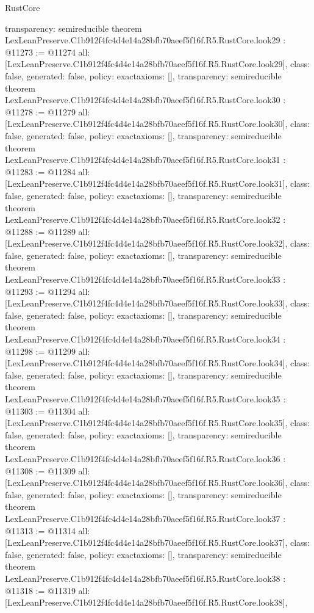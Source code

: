 \begin{lexlean}{RustCore}
\begin{coremodule}
{  transparency: semireducible
}
theorem LexLeanPreserve.C1b912f4fc4d4e14a28bfb70aeef5f16f.R5.RustCore.look29 : @11273 := @11274 {
  all: [LexLeanPreserve.C1b912f4fc4d4e14a28bfb70aeef5f16f.R5.RustCore.look29],
  class: false,
  generated: false,
  policy: exact{axioms: []},
  transparency: semireducible
}
theorem LexLeanPreserve.C1b912f4fc4d4e14a28bfb70aeef5f16f.R5.RustCore.look30 : @11278 := @11279 {
  all: [LexLeanPreserve.C1b912f4fc4d4e14a28bfb70aeef5f16f.R5.RustCore.look30],
  class: false,
  generated: false,
  policy: exact{axioms: []},
  transparency: semireducible
}
theorem LexLeanPreserve.C1b912f4fc4d4e14a28bfb70aeef5f16f.R5.RustCore.look31 : @11283 := @11284 {
  all: [LexLeanPreserve.C1b912f4fc4d4e14a28bfb70aeef5f16f.R5.RustCore.look31],
  class: false,
  generated: false,
  policy: exact{axioms: []},
  transparency: semireducible
}
theorem LexLeanPreserve.C1b912f4fc4d4e14a28bfb70aeef5f16f.R5.RustCore.look32 : @11288 := @11289 {
  all: [LexLeanPreserve.C1b912f4fc4d4e14a28bfb70aeef5f16f.R5.RustCore.look32],
  class: false,
  generated: false,
  policy: exact{axioms: []},
  transparency: semireducible
}
theorem LexLeanPreserve.C1b912f4fc4d4e14a28bfb70aeef5f16f.R5.RustCore.look33 : @11293 := @11294 {
  all: [LexLeanPreserve.C1b912f4fc4d4e14a28bfb70aeef5f16f.R5.RustCore.look33],
  class: false,
  generated: false,
  policy: exact{axioms: []},
  transparency: semireducible
}
theorem LexLeanPreserve.C1b912f4fc4d4e14a28bfb70aeef5f16f.R5.RustCore.look34 : @11298 := @11299 {
  all: [LexLeanPreserve.C1b912f4fc4d4e14a28bfb70aeef5f16f.R5.RustCore.look34],
  class: false,
  generated: false,
  policy: exact{axioms: []},
  transparency: semireducible
}
theorem LexLeanPreserve.C1b912f4fc4d4e14a28bfb70aeef5f16f.R5.RustCore.look35 : @11303 := @11304 {
  all: [LexLeanPreserve.C1b912f4fc4d4e14a28bfb70aeef5f16f.R5.RustCore.look35],
  class: false,
  generated: false,
  policy: exact{axioms: []},
  transparency: semireducible
}
theorem LexLeanPreserve.C1b912f4fc4d4e14a28bfb70aeef5f16f.R5.RustCore.look36 : @11308 := @11309 {
  all: [LexLeanPreserve.C1b912f4fc4d4e14a28bfb70aeef5f16f.R5.RustCore.look36],
  class: false,
  generated: false,
  policy: exact{axioms: []},
  transparency: semireducible
}
theorem LexLeanPreserve.C1b912f4fc4d4e14a28bfb70aeef5f16f.R5.RustCore.look37 : @11313 := @11314 {
  all: [LexLeanPreserve.C1b912f4fc4d4e14a28bfb70aeef5f16f.R5.RustCore.look37],
  class: false,
  generated: false,
  policy: exact{axioms: []},
  transparency: semireducible
}
theorem LexLeanPreserve.C1b912f4fc4d4e14a28bfb70aeef5f16f.R5.RustCore.look38 : @11318 := @11319 {
  all: [LexLeanPreserve.C1b912f4fc4d4e14a28bfb70aeef5f16f.R5.RustCore.look38],
}
\end{coremodule}
\end{lexlean}

